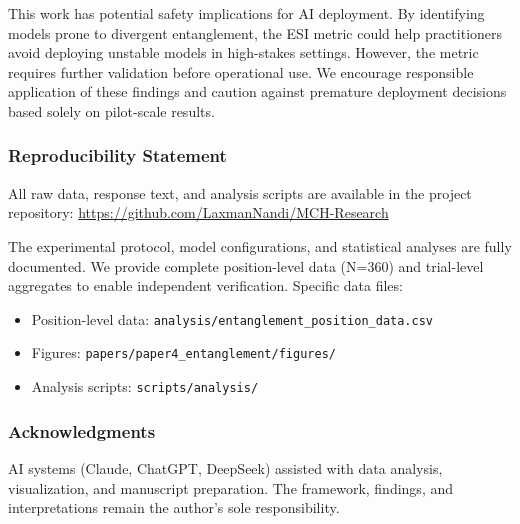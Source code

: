 \documentclass[11pt]{article}
\begin{document}
This work has potential safety implications for AI deployment. By identifying models prone to divergent entanglement, the ESI metric could help practitioners avoid deploying unstable models in high-stakes settings. However, the metric requires further validation before operational use. We encourage responsible application of these findings and caution against premature deployment decisions based solely on pilot-scale results.

\subsubsection*{Reproducibility Statement}

All raw data, response text, and analysis scripts are available in the project repository: \url{https://github.com/LaxmanNandi/MCH-Research}

The experimental protocol, model configurations, and statistical analyses are fully documented. We provide complete position-level data (N=360) and trial-level aggregates to enable independent verification. Specific data files:
\begin{itemize}
    \item Position-level data: \texttt{analysis/entanglement\_position\_data.csv}
    \item Figures: \texttt{papers/paper4\_entanglement/figures/}
    \item Analysis scripts: \texttt{scripts/analysis/}
\end{itemize}

\subsubsection*{Acknowledgments}

AI systems (Claude, ChatGPT, DeepSeek) assisted with data analysis, visualization, and manuscript preparation. The framework, findings, and interpretations remain the author's sole responsibility.



\end{document}
